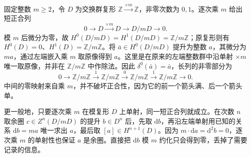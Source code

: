 \begin{example}\label{b4:exm:connecting-divisibility}
	固定整数 \(m\ge2\)，令 \(D\) 为交换群复形 \(\mathbb Z\xrightarrow{\times m}\mathbb Z\)，非零次数为 \(0,1\)。逐次乘 \(m\) 给出短正合列
	\[
		0\longrightarrow D\xrightarrow{\times m}D\longrightarrow D/mD\longrightarrow0.
	\]
	模 \(m\) 后微分为零，故 \(H^0(D/mD)=H^1(D/mD)=\mathbb Z/m\mathbb Z\)；原复形则有 \(H^0(D)=0\)、\(H^1(D)=\mathbb Z/m\mathbb Z\)。将 \(\bar a\in H^0(D/mD)\) 提升为整数 \(a\)，其微分为 \(ma\)，通过左端嵌入乘 \(m\) 取原像得到 \(a\)。这里是在原来的左端整数群中沿单射 \(\times m\) 唯一取原像，并非在 \(\mathbb Z/m\mathbb Z\) 中作除法。因此 \(\delta^0(\bar a)=\bar a\)，长列的非零部分为
	\[
		0\longrightarrow\mathbb Z/m\mathbb Z\xrightarrow{1}\mathbb Z/m\mathbb Z \xrightarrow{0}\mathbb Z/m\mathbb Z\xrightarrow{1}\mathbb Z/m\mathbb Z\longrightarrow0.
	\]
	中间的零映射来自乘 \(m\)，并不破坏正合性，因为它的前一个箭头满、后一个箭头单。
\end{example}

更一般地，只要逐次乘 \(m\) 在模复形 \(D\) 上单射，同一短正合列就成立。在次数 \(n\) 取余圈 \(c\in Z^n(D/mD)\) 的提升 \(b\in D^n\) 后，先取 \(\mathrm{d}b\)，再沿左端单射用已知的关系 \(\mathrm{d}b=ma\) 唯一求出 \(a\)，最后取 \([a]\in H^{n+1}(D)\)。因为 \(m\cdot\mathrm{d}a=\mathrm{d}^2b=0\)，逐次乘 \(m\) 的单射性也保证 \(a\) 是余圈。直接把 \(\mathrm{d}b\) 模 \(m\) 约化只会得到零，丢掉了需要记录的信息。

